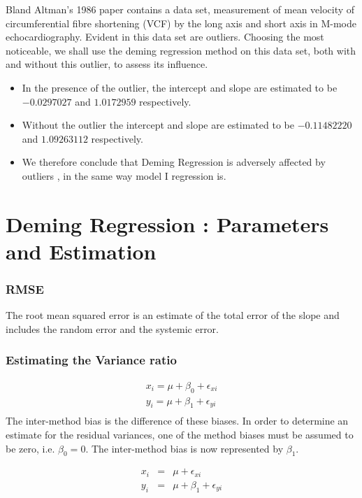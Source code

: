 \documentclass[12pt, a4paper]{report}
\theoremstyle{plain}
\theoremstyle{definition}
\theoremstyle{remark}
\begin{document}
Bland Altman's 1986 paper contains a data set, measurement of mean velocity of circumferential fibre shortening (VCF) by the long axis and short axis in M-mode echocardiography. Evident in this data set are outliers. Choosing the most noticeable, we shall use the deming regression method on this data set, both with and
without this outlier, to assess its influence.
\begin{itemize}
	\item In the presence of the outlier, the intercept and slope are estimated to be $-0.0297027$ and $1.0172959$ respectively.
	\item Without the outlier the intercept and slope are estimated to be
	$-0.11482220$ and  $1.09263112$ respectively.
	\item We therefore conclude that Deming Regression is adversely affected
	by outliers , in the same way model I regression is.
\end{itemize}



\section{Deming Regression : Parameters and Estimation}
\subsubsection{RMSE}
The root mean squared error is an estimate of the total error of the slope and includes the random error and the systemic error.

\subsubsection{Estimating the Variance ratio}
\begin{eqnarray*}
	x_{i} = \mu +  \beta_{0} + \epsilon_{xi}\\
	y_{i} = \mu +  \beta_{1} + \epsilon_{yi}\\
\end{eqnarray*}
The inter-method bias is the difference of these biases. In order to determine an estimate for the residual variances, one of the method biases must be assumed to be zero, i.e. $\beta_{0} = 0$. The inter-method bias is now represented by $\beta_{1}$.

\begin{eqnarray*}
	x_{i} &=& \mu + \epsilon_{xi}\\
	y_{i} &=& \mu +  \beta_{1} + \epsilon_{yi}\\
\end{eqnarray*}
\end{document}
